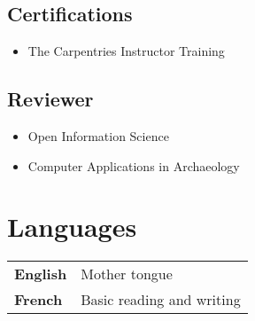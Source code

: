 \documentclass[11pt, a4paper]{article}
\newcommand{\TablePad}{\vspace{-0.4cm}}
\begin{document}
\subsection{Certifications}
\begin{itemize}
  \item The Carpentries Instructor Training
\end{itemize}

\subsection{Reviewer}
\begin{itemize}
  \item Open Information Science
  \item Computer Applications in Archaeology
\end{itemize}

\section{Languages}
\TablePad
\begin{tabularx}{\textwidth}{@{}p{} p{}@{}}
  \textbf{English} & Mother tongue
  \\
  \textbf{French}  & Basic reading and writing
\end{tabularx}
\end{document}
